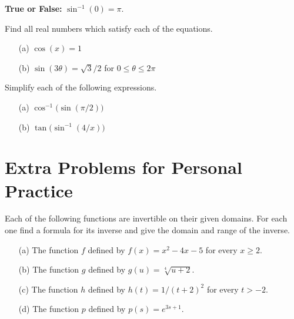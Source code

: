 \message{ !name(Breakout Session 1 Solutions.tex)}\documentclass[nooutcomes]{ximera}
\begin{document}
\begin{problem}
  \label{problem:applying-domain-of-arcsin}
  \textbf{True or False:}
  $\sin^{-1}(0) = \pi$.
\end{problem}

\begin{problem}
  \label{problem:solving-trigonometric-equations}
  Find all real numbers which satisfy each of the equations.
  \begin{itemize}
    \item[(a)]
      $\cos(x) = 1$
    \item[(b)]
      $\sin(3 \theta) = \sqrt{3}/2$ for $0 \leq \theta \leq 2\pi$
  \end{itemize}
\end{problem}

\begin{problem}
  \label{problem:simplifying-trigonometric-expressions}
  Simplify each of the following expressions.
  \begin{itemize}
    \item[(a)]
      $\cos^{-1} \bigl( \sin(\pi/2) \bigr)$
    \item[(b)]
      $\tan \bigl( \sin^{-1}(4/x ) \bigr)$
  \end{itemize}
\end{problem}

\section{Extra Problems for  Personal Practice}
\label{section:extra-problems}

\begin{problem}
  \label{problem:computing-inverse-algebraically}
  Each of the following functions are invertible on their given domains.
  For each one find a formula for its inverse and give the domain and range of the inverse.
  \begin{itemize}
    \item[(a)]
      The function $f$ defined by $f(x)=x^2-4x-5$ for every $x \ge 2$.

    \item[(b)]
      The function $g$ defined by $g(u) = \sqrt[4]{u + 2}$.

    \item[(c)]
      The function $h$ defined by $h(t) = 1/(t+2)^2$ for every $t > -2$.

    \item[(d)]
      The function $p$ defined by $p(s) = e^{3s+1}$.
  \end{itemize}
\end{problem}
\end{document}
